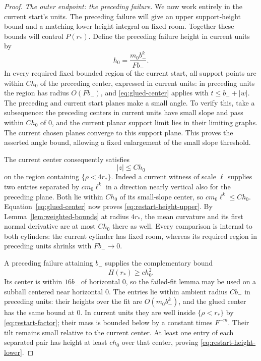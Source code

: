 \begin{proof}
\emph{The outer endpoint: the preceding failure.}
We now work entirely in the current start's units. The preceding failure
will give an upper support-height bound and a matching lower height
integral on fixed room. Together these bounds will control $P(r_*)$.
Define the preceding failure height in current units by
\[
 h_0=\frac{m_0b_-^k}{Fb_-}.
\]
In every required fixed bounded region of the current start, all
support points are within $Ch_0$ of the preceding center, expressed
in current units: in preceding units the region has radius $O(Fb_-)$,
and \eqref{eq:glued-center} applies with $t\le b_-+|w|$.
The preceding and current start planes make a small angle. To verify
this, take a subsequence: the preceding centers in current units have
small slope and pass within $Ch_0$ of $0$, and the current planar
support limit lies in their limiting graphs. The current chosen
planes converge to this support plane. This proves the asserted angle
bound, allowing a fixed enlargement of the small slope threshold.

The current center consequently satisfies
\begin{equation}\label{eq:restart-height-upper}
 |z|\le Ch_0
\end{equation}
on the region containing $\{\rho<4r_*\}$. Indeed a current witness
of scale $\ell$ supplies two entries separated by $cm_0\ell^k$ in
a direction nearly vertical also for the preceding plane. Both lie
within $Ch_0$ of its small-slope center, so $cm_0\ell^k\le Ch_0$.
Equation~\eqref{eq:glued-center} now proves
\eqref{eq:restart-height-upper}. By Lemma~\ref{lem:weighted-bounds}
at radius $4r_*$, the mean curvature and its first normal derivative
are at most $Ch_0$ there as well. Every comparison is internal to both
cylinders: the current cylinder has fixed room, whereas its required
region in preceding units shrinks with $Fb_-\to0$.

A preceding failure attaining $b_-$ supplies the complementary bound
\begin{equation}\label{eq:restart-height-lower}
 H(r_*)\ge ch_0^2.
\end{equation}
Its center is within $16b_-$ of horizontal $0$, so the failed-fit
lemma may be used on a subball centered near horizontal $0$.
The entries lie within ambient radius $Cb_-$ in preceding units:
their heights over the fit are $O(m_0b_-^k)$, and the glued center
has the same bound at $0$. In current units they are well inside
$\{\rho<r_*\}$ by \eqref{eq:restart-factor}; their mass is bounded
below by a constant times $F^{-m}$. Their tilt remains small relative
to the current center. At least one entry of each separated pair has
height at least $ch_0$ over that center, proving
\eqref{eq:restart-height-lower}.


\end{proof}
